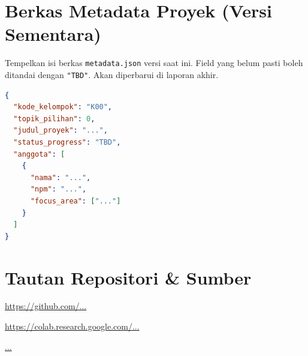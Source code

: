 \documentclass[11pt,a4paper,oneside]{report}
\begin{document}
\chapter{Berkas Metadata Proyek (Versi Sementara)}
\label{lamp:metadata}

\begin{petunjuk}
Tempelkan isi berkas \texttt{metadata.json} versi saat ini. Field yang belum pasti boleh ditandai dengan \texttt{"TBD"}. Akan diperbarui di laporan akhir.
\end{petunjuk}

\begin{lstlisting}[language=json]
{
  "kode_kelompok": "K00",
  "topik_pilihan": 0,
  "judul_proyek": "...",
  "status_progress": "TBD",
  "anggota": [
    {
      "nama": "...",
      "npm": "...",
      "focus_area": ["..."]
    }
  ]
}
\end{lstlisting}

\chapter{Tautan Repositori \& Sumber}
\label{lamp:tautan}

\begin{description}[leftmargin=4cm,labelwidth=3.5cm]
    \item[GitHub repo:] \url{https://github.com/...}
    \item[Google Colab:] \url{https://colab.research.google.com/...}
    \item[Sumber dataset:] \url{...}
\end{description}
\end{document}
